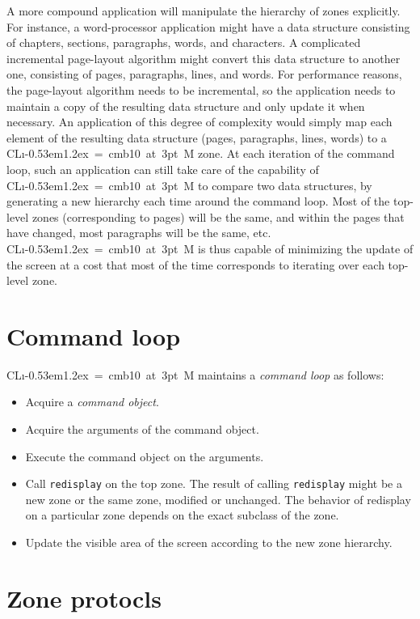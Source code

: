 \documentclass{report}
\def\Tiny{ \font\Tinyfont = cmb10 at 3pt \relax  \Tinyfont}
\def\clim{\textsf{CL{\i}\kern-0.53em\raise1.2ex\hbox{\Tiny 3}M}}
\def\code#1{\texttt{#1}}
\begin{document}
A more compound application will manipulate the hierarchy of zones
explicitly.  For instance, a word-processor application might have a
data structure consisting of chapters, sections, paragraphs, words,
and characters.  A complicated incremental page-layout algorithm might
convert this data structure to another one, consisting of pages,
paragraphs, lines, and words.  For performance reasons, the
page-layout algorithm needs to be incremental, so the application
needs to maintain a copy of the resulting data structure and only
update it when necessary.  An application of this degree of complexity
would simply map each element of the resulting data structure (pages,
paragraphs, lines, words) to a \clim{} zone.  At each iteration of
the command loop, such an application can still take care of the
capability of \clim{} to compare two data structures, by generating a
new hierarchy each time around the command loop.  Most of the
top-level zones (corresponding to pages) will be the same, and
within the pages that have changed, most paragraphs will be the same,
etc.  \clim{} is thus capable of minimizing the update of the screen at
a cost that most of the time corresponds to iterating over each
top-level zone. 

\chapter{Command loop}

\clim{} maintains a \emph{command loop} as follows:

\begin{itemize}
\item Acquire a \emph{command object}.
\item Acquire the arguments of the command object.
\item Execute the command object on the arguments.
\item Call \code{redisplay} on the top zone.  The result of calling
  \code{redisplay} might be a new zone or the same zone, modified
  or unchanged.  The behavior of redisplay on a particular zone
  depends on the exact subclass of the zone.
\item Update the visible area of the screen according to the new
  zone hierarchy.
\end{itemize}

\chapter{Zone protocls}
\end{document}
